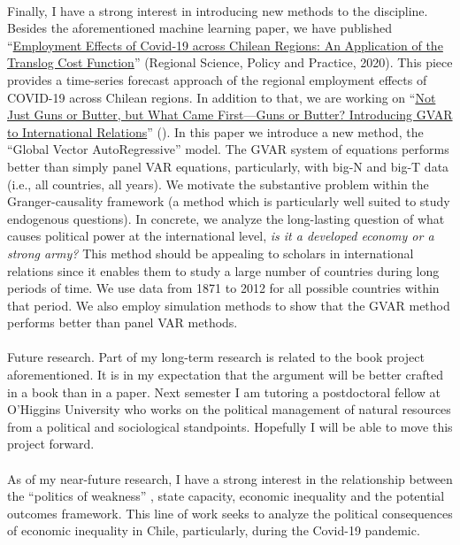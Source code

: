 \documentclass[letterpaper]{article}
\begin{document}
\paragraph{}Finally, I have a strong interest in introducing new methods to the discipline. Besides the aforementioned machine learning paper, we have published ``\href{https://doi.org/10.1111/rsp3.12337}{Employment Effects of Covid‐19 across Chilean Regions: An Application of the Translog Cost Function}'' (Regional Science, Policy and Practice, 2020).  This piece provides a time-series forecast approach of the regional employment effects of COVID-19 across Chilean regions. In addition to that, we are working on ``\href{https://github.com/hbahamonde/Bahamonde_Kovac/raw/master/abstract.txt}{Not Just Guns or Butter, but What Came First---Guns or Butter? Introducing GVAR to International Relations}'' (\emph{\unskip}). In this paper we introduce a new method, the ``Global Vector AutoRegressive'' model. The GVAR system of equations performs better than simply panel VAR equations, particularly, with big-N and big-T data (i.e., all countries, all years). We motivate the substantive problem within the Granger-causality framework (a method which is particularly well suited to study endogenous questions). In concrete, we analyze the long-lasting question of what causes political power at the international level, \emph{is it a developed economy or a strong army?} This method should be appealing to scholars in international relations since it enables them to study a large number of countries during long periods of time. We use data from 1871 to 2012 for all possible countries within that period. We also employ simulation methods to show that the GVAR method performs better than panel VAR methods. 

\paragraph{}{Future research.} Part of my long-term research is related to the book project aforementioned. It is in my expectation that the argument will be better crafted in a book than in a paper. Next semester I am tutoring a postdoctoral fellow at O'Higgins University who works on the political management of natural resources from a political and sociological standpoints. Hopefully I will be able to move this project forward. 

\paragraph{}As of my near-future research, I have a strong interest in the relationship between the ``politics of weakness'' \parencite{Brinks2020}, state capacity, economic inequality and the potential outcomes framework. This line of work seeks to analyze the political consequences of economic inequality in Chile, particularly, during the Covid-19 pandemic. 
\end{document}
